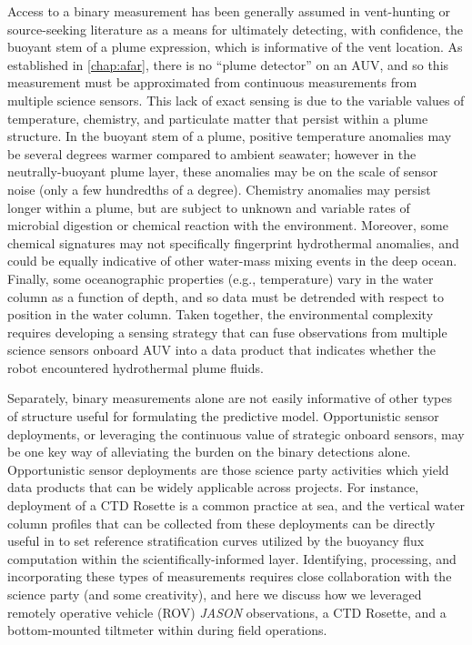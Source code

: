 Access to a binary measurement has been generally assumed in vent-hunting or source-seeking literature\autocite{tian2014behavior,saigol2009information,jakuba2007stochastic} as a means for ultimately detecting, with confidence, the buoyant stem of a plume expression, which is informative of the vent location. As established in \cref{chap:afar}, there is no ``plume detector'' on an AUV, and so this measurement must be approximated from continuous measurements from multiple science sensors. This lack of exact sensing is due to the variable values of temperature, chemistry, and particulate matter that persist within a plume structure. In the buoyant stem of a plume, positive temperature anomalies may be several degrees warmer compared to ambient seawater; however in the neutrally-buoyant plume layer, these anomalies may be on the scale of sensor noise (only a few hundredths of a degree). Chemistry anomalies may persist longer within a plume, but are subject to unknown and variable rates of microbial digestion or chemical reaction with the environment. Moreover, some chemical signatures may not specifically fingerprint hydrothermal anomalies, and could be equally indicative of other water-mass mixing events in the deep ocean. Finally, some oceanographic properties (e.g., temperature) vary in the water column as a function of depth, and so data must be detrended with respect to position in the water column. Taken together, the environmental complexity requires developing a sensing strategy that can fuse observations from multiple science sensors onboard AUV \Sentry into a data product that indicates whether the robot encountered hydrothermal plume fluids.

Separately, binary measurements alone are not easily informative of other types of structure useful for formulating the \PHUMES predictive model. Opportunistic sensor deployments, or leveraging the continuous value of strategic onboard sensors, may be one key way of alleviating the burden on the binary detections alone. Opportunistic sensor deployments are those science party activities which yield data products that can be widely applicable across projects. For instance, deployment of a CTD Rosette is a common practice at sea, and the vertical water column profiles that can be collected from these deployments can be directly useful in \PHUMES to set reference stratification curves utilized by the buoyancy flux computation within the scientifically-informed layer. Identifying, processing, and incorporating these types of measurements requires close collaboration with the science party (and some creativity), and here we discuss how we leveraged remotely operative vehicle (ROV) \emph{JASON} observations, a CTD Rosette, and a bottom-mounted tiltmeter within \PHUMES during field operations.

